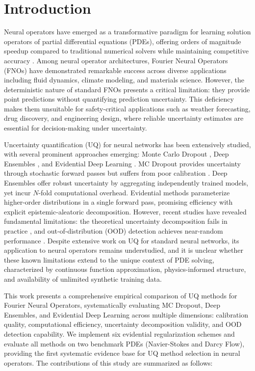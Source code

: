 \section{Introduction}

Neural operators have emerged as a transformative paradigm for learning solution operators of partial differential 
equations (PDEs), offering orders of magnitude speedup compared to traditional numerical solvers while maintaining 
competitive accuracy \cite{li2020fourier,lu2021deeponet}. Among neural operator architectures, Fourier Neural 
Operators (FNOs) have demonstrated remarkable success across diverse applications including fluid dynamics, 
climate modeling, and materials science. However, the deterministic nature of standard FNOs presents a critical 
limitation: they provide point predictions without quantifying prediction uncertainty. This deficiency makes 
them unsuitable for safety-critical applications such as weather forecasting, drug discovery, and engineering 
design, where reliable uncertainty estimates are essential for decision-making under uncertainty.

Uncertainty quantification (UQ) for neural networks has been extensively studied, with several prominent 
approaches emerging: Monte Carlo Dropout \cite{gal2016dropout}, Deep Ensembles \cite{lakshminarayanan2017simple}, 
and Evidential Deep Learning \cite{sensoy2018evidential,amini2020deep}. MC Dropout provides uncertainty through 
stochastic forward passes but suffers from poor calibration \cite{ovadia2019can}. Deep Ensembles offer robust 
uncertainty by aggregating independently trained models, yet incur $N$-fold computational overhead. Evidential 
methods parameterize higher-order distributions in a single forward pass, promising efficiency with explicit 
epistemic-aleatoric decomposition. However, recent studies have revealed fundamental limitations: the theoretical 
uncertainty decomposition fails in practice \cite{jurgens2024epistemic,ulmer2024prior}, and 
out-of-distribution (OOD) detection achieves near-random performance \cite{meinke2024uncertaintyquantification}. 
Despite extensive work on UQ for standard neural networks, its application to neural operators remains understudied, 
and it is unclear whether these known limitations extend to the unique context of PDE solving, characterized by 
continuous function approximation, physics-informed structure, and availability of unlimited synthetic training data.

This work presents a comprehensive empirical comparison of UQ methods for Fourier Neural Operators, 
systematically evaluating MC Dropout, Deep Ensembles, and Evidential Deep Learning across multiple dimensions: 
calibration quality, computational efficiency, uncertainty decomposition validity, and OOD detection capability. 
We implement six evidential regularization schemes and evaluate all methods on two benchmark PDEs 
(Navier-Stokes and Darcy Flow), providing the first systematic evidence base for UQ method selection in 
neural operators. The contributions of this study are summarized as follows:


